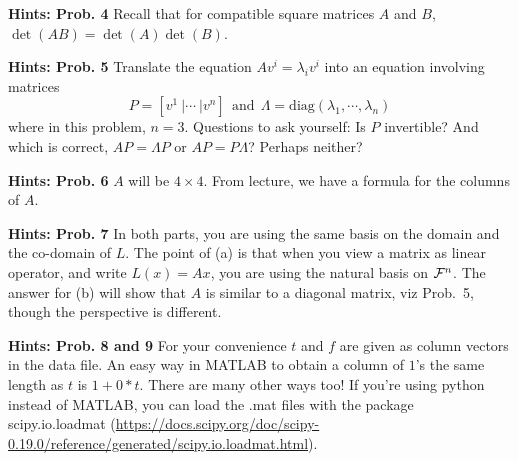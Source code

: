 \documentclass[letterpaper]{article}
\begin{document}
\vspace{1cm}

\noindent \textbf{Hints: Prob. 4} Recall that for compatible square matrices $A$ and $B$, $\det(AB) = \det(A) \det(B)$.\\

\vspace{1cm}

\noindent \textbf{Hints: Prob. 5} Translate the equation $A v^i = \lambda_i v^i$ into an equation involving matrices
$$P = [v^1~|\cdots~ | v^n] ~~ \mbox{and} ~~  \Lambda = \mathrm{diag} (\lambda_1, \cdots , \lambda_n) $$
where in this problem, $n=3$. Questions to ask yourself: Is $P$ invertible? And which is correct, $AP = \Lambda P$ or
$AP = P \Lambda $? Perhaps neither?
\vspace{1cm}

\noindent \textbf{Hints: Prob. 6}  $A$ will be $4 \times 4$. From lecture, we have a formula for the columns of $A$. \\

\vspace{1cm}

\noindent \textbf{Hints: Prob. 7} In both parts, you are using the same basis on the domain and the co-domain of $L$.  The point of (a) is that when you view a matrix as linear operator, and write $L(x) = Ax$, you are using the natural basis on ${\cal F}^n$. The answer for (b) will show that $A$ is similar to a diagonal matrix, viz Prob.~5, though the perspective is different.

\vspace{1cm}

\noindent \textbf{Hints: Prob. 8 and 9}
For your convenience $t$ and $f$ are given as column vectors in the data file.
An easy way in MATLAB to obtain a column of $1$'s the same length as $t$ is $1+0*t$. There are many other ways too!
If you're using python instead of MATLAB, you can load the .mat files with the package scipy.io.loadmat (\url{https://docs.scipy.org/doc/scipy-0.19.0/reference/generated/scipy.io.loadmat.html}).
\end{document}

